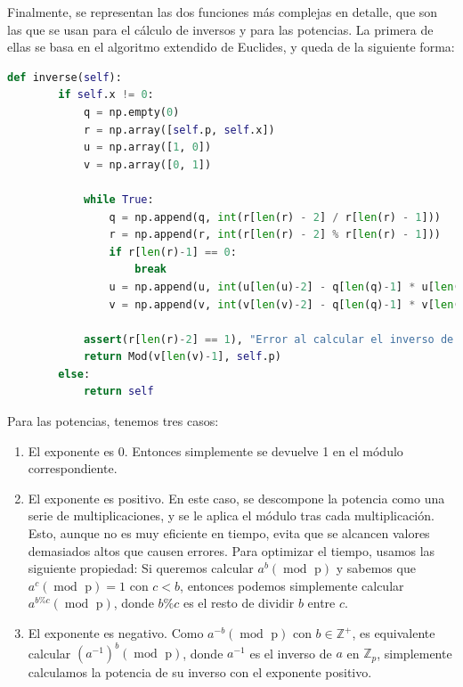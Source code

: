 Finalmente, se representan las dos funciones más complejas en detalle, que son las que se usan para el cálculo de inversos y para las potencias. La primera de ellas se basa en el algoritmo extendido de Euclides, y queda de la siguiente forma:
\begin{lstlisting}[language=Python, basicstyle=\footnotesize]
    def inverse(self):
        if self.x != 0:
            q = np.empty(0)
            r = np.array([self.p, self.x])
            u = np.array([1, 0])
            v = np.array([0, 1])

            while True:
                q = np.append(q, int(r[len(r) - 2] / r[len(r) - 1]))
                r = np.append(r, int(r[len(r) - 2] % r[len(r) - 1]))
                if r[len(r)-1] == 0:
                    break
                u = np.append(u, int(u[len(u)-2] - q[len(q)-1] * u[len(u)-1]))
                v = np.append(v, int(v[len(v)-2] - q[len(q)-1] * v[len(v)-1]))

            assert(r[len(r)-2] == 1), "Error al calcular el inverso de {}".format(self)
            return Mod(v[len(v)-1], self.p)
        else:
            return self
\end{lstlisting}

Para las potencias, tenemos tres casos:
\begin{enumerate}
    \item El exponente es 0. Entonces simplemente se devuelve 1 en el módulo correspondiente.

    \item El exponente es positivo. En este caso, se descompone la potencia como una serie de multiplicaciones, y se le aplica el módulo tras cada multiplicación. Esto, aunque no es muy eficiente en tiempo, evita que se alcancen valores demasiados altos que causen errores. Para optimizar el tiempo, usamos las siguiente propiedad: Si queremos calcular $a^{b} (\operatorname{mod} \text{ p})$ y sabemos que $a^{c} (\operatorname{mod} \text{ p}) = 1$ con $c < b$, entonces podemos simplemente calcular $a^{b \% c} (\operatorname{mod} \text{ p})$, donde $b \% c$ es el resto de dividir $b$ entre $c$.

    \item El exponente es negativo. Como $a^{-b} (\operatorname{mod} \text{ p})$ con $b \in \mathbb{Z}^{+}$, es equivalente calcular $(a^{-1})^{b} (\operatorname{mod} \text{ p})$, donde $a^{-1}$ es el inverso de $a$ en $\mathbb{Z}_{p}$, simplemente calculamos la potencia de su inverso con el exponente positivo.
\end{enumerate}

